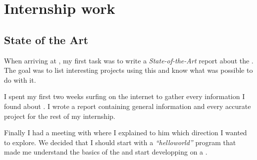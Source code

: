 
\chapter{Internship work} %

\label{Chapter2} %




\section{State of the Art}

When arriving at \groupname{}, my first task was to write a \emph{State-of-the-Art} report about the \vc{}. The goal was to list interesting projects using this  and know what was possible to do with it.

I spent my first two weeks surfing on the internet to gather every information I found about \vc. I wrote a report containing general information and every accurate project for the rest of my internship.

Finally I had a meeting with \supname{} where I explained to him which direction I wanted to explore. We decided that I should start with a \emph{\enquote{helloworld}} program that made me understand the basics of the \vc{} and start developping on a \rasp.


